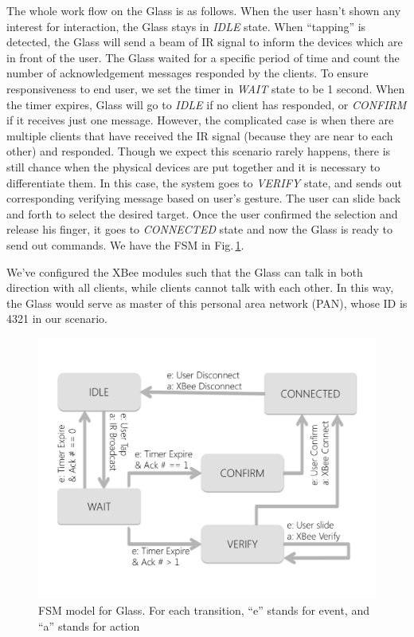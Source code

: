 The whole work flow on the Glass is as follows. When the user hasn't shown any interest for interaction, the Glass stays in {\it IDLE} state. When ``tapping'' is detected, the Glass will send a beam of IR signal to inform the devices which are in front of the user. The Glass waited for a specific period of time and count the number of acknowledgement messages responded by the clients. To ensure responsiveness to end user, we set the timer in {\it WAIT} state to be 1 second. When the timer expires, Glass will go to {\it IDLE} if no client has responded, or {\it CONFIRM} if it receives just one message. However, the complicated case is when there are multiple clients that have received the IR signal (because they are near to each other) and responded. Though we expect this scenario rarely happens, there is still chance when the physical devices are put together and it is necessary to differentiate them. In this case, the system goes to {\it VERIFY} state, and sends out corresponding verifying message based on user's gesture. The user can slide back and forth to select the desired target. Once the user confirmed the selection and release his finger, it goes to {\it CONNECTED} state and now the Glass is ready to send out commands. We have the FSM in Fig.\,\ref{fig:glassFSM}.

We've configured the XBee modules such that the Glass can talk in both direction with all clients, while clients cannot talk with each other. In this way, the Glass would serve as master of this personal area network (PAN), whose ID is 4321 in our scenario. 

\begin{figure}
  \centering
  \includegraphics[width=\linewidth]{../figs/glassFSM.pdf}
  \caption{FSM model for Glass. For each transition, ``e'' stands for event, and ``a'' stands for action}
  \label{fig:glassFSM}
\end{figure}

